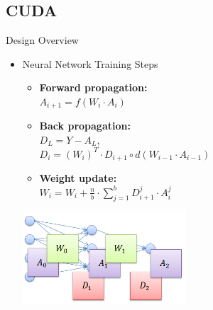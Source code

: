 \subsection{CUDA}
\begin{frame}{Design Overview}

\begin{itemize}

\item{ Neural Network Training Steps }
\begin{itemize}
\item{\textbf{Forward propagation:}  \\$A_{i+1} = f(W_{i} \cdot A_{i})$}
\item{\textbf{Back propagation:}  \\$D_L =Y - A_L$,\\ $D_i = (W_{i})^{T}\cdot D_{i+1} \circ d(W_{i-1} \cdot A_{i-1})$}
\item{\textbf{Weight update:} \\$W_{i} = W_{i} + \frac{n}{b} \cdot \sum_{j=1}^{b} D_{i+1}^{j} \cdot A_{i}^j$}
\end{itemize}

\begin{center}
\includegraphics[width=2.4in]{gpu_neural_net_data.png}
\end{center}

\end{itemize}

\end{frame}

